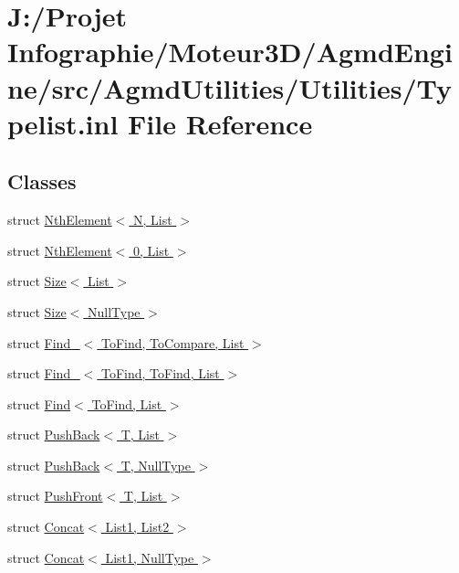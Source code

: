 \hypertarget{_typelist_8inl}{\section{J\-:/\-Projet Infographie/\-Moteur3\-D/\-Agmd\-Engine/src/\-Agmd\-Utilities/\-Utilities/\-Typelist.inl File Reference}
\label{_typelist_8inl}
}
\subsection*{Classes}
\begin{DoxyCompactItemize}
\item 
struct \hyperlink{struct_nth_element}{Nth\-Element$<$ N, List $>$}
\item 
struct \hyperlink{struct_nth_element_3_010_00_01_list_01_4}{Nth\-Element$<$ 0, List $>$}
\item 
struct \hyperlink{struct_size}{Size$<$ List $>$}
\item 
struct \hyperlink{struct_size_3_01_null_type_01_4}{Size$<$ Null\-Type $>$}
\item 
struct \hyperlink{struct_find__}{Find\-\_\-$<$ To\-Find, To\-Compare, List $>$}
\item 
struct \hyperlink{struct_find___3_01_to_find_00_01_to_find_00_01_list_01_4}{Find\-\_\-$<$ To\-Find, To\-Find, List $>$}
\item 
struct \hyperlink{struct_find}{Find$<$ To\-Find, List $>$}
\item 
struct \hyperlink{struct_push_back}{Push\-Back$<$ T, List $>$}
\item 
struct \hyperlink{struct_push_back_3_01_t_00_01_null_type_01_4}{Push\-Back$<$ T, Null\-Type $>$}
\item 
struct \hyperlink{struct_push_front}{Push\-Front$<$ T, List $>$}
\item 
struct \hyperlink{struct_concat}{Concat$<$ List1, List2 $>$}
\item 
struct \hyperlink{struct_concat_3_01_list1_00_01_null_type_01_4}{Concat$<$ List1, Null\-Type $>$}
\end{DoxyCompactItemize}

